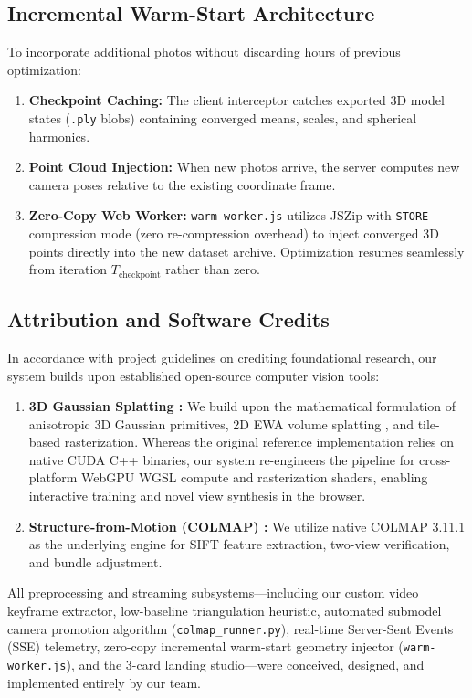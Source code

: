 \documentclass[conference]{IEEEtran}
\begin{document}
\subsection{Incremental Warm-Start Architecture}
To incorporate additional photos without discarding hours of previous optimization:
\begin{enumerate}
    \item \textbf{Checkpoint Caching:} The client interceptor catches exported 3D model states (\texttt{.ply} blobs) containing converged means, scales, and spherical harmonics.
    \item \textbf{Point Cloud Injection:} When new photos arrive, the server computes new camera poses relative to the existing coordinate frame.
    \item \textbf{Zero-Copy Web Worker:} \texttt{warm-worker.js} utilizes JSZip with \texttt{STORE} compression mode (zero re-compression overhead) to inject converged 3D points directly into the new dataset archive. Optimization resumes seamlessly from iteration $T_{\text{checkpoint}}$ rather than zero.
\end{enumerate}

\subsection{Attribution and Software Credits}
In accordance with project guidelines on crediting foundational research, our system builds upon established open-source computer vision tools:
\begin{enumerate}
    \item \textbf{3D Gaussian Splatting \cite{kerbl20233d}:} We build upon the mathematical formulation of anisotropic 3D Gaussian primitives, 2D EWA volume splatting \cite{zwicker2001ewa}, and tile-based rasterization. Whereas the original reference implementation relies on native CUDA C++ binaries, our system re-engineers the pipeline for cross-platform WebGPU WGSL compute and rasterization shaders, enabling interactive training and novel view synthesis in the browser.
    \item \textbf{Structure-from-Motion (COLMAP) \cite{schonberger2016sfm, schonberger2016mvs}:} We utilize native COLMAP 3.11.1 as the underlying engine for SIFT feature extraction, two-view verification, and bundle adjustment.
\end{enumerate}
All preprocessing and streaming subsystems—including our custom video keyframe extractor, low-baseline triangulation heuristic, automated submodel camera promotion algorithm (\texttt{colmap\_runner.py}), real-time Server-Sent Events (SSE) telemetry, zero-copy incremental warm-start geometry injector (\texttt{warm-worker.js}), and the 3-card landing studio—were conceived, designed, and implemented entirely by our team.
\end{document}
